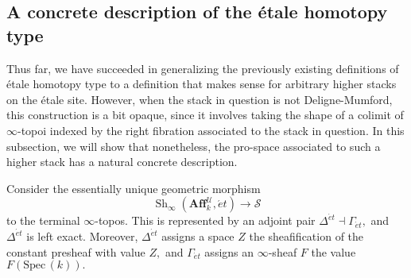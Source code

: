 \documentclass[12pt]{amsart}
\theoremstyle{definition}
\newcommand{\cS}{\mathcal{S}}
\newcommand{\cU}{\mathcal{U}}
\newcommand{\Affku}{\mathbf{Aff}^{\cU}_{k}}
\newcommand{\Spec}{\mathrm{Spec}\,}
\newcommand{\Sh}{\operatorname{Sh}}
\newcommand{\et}{\acute{e}t}
\renewcommand{\i}{\infty}
\def\Shi{\Sh_\i}
\begin{document}
\subsection{A concrete description of the \'etale homotopy type}

Thus far, we have succeeded in generalizing the previously existing definitions of \'etale homotopy type to a definition that makes sense for arbitrary higher stacks on the \'etale site. However, when the stack in question is not Deligne-Mumford, this construction is a bit opaque, since it involves taking the shape of a colimit of $\i$-topoi indexed by the right fibration associated to the stack in question. In this subsection, we will show that nonetheless, the pro-space associated to such a higher stack has a natural concrete description.

Consider the essentially unique geometric morphism $$\Shi\left(\Affku,\et\right) \to \cS$$ to the terminal $\i$-topos. This is represented by an adjoint pair $\Delta^{\et} \dashv \Gamma_{\et},$ and $\Delta^{\et}$ is left exact. Moreover, $\Delta^{\et}$ assigns a space $Z$ the sheafification of the constant presheaf with value $Z,$ and $\Gamma_{\et}$ assigns an $\i$-sheaf $F$ the value $F\left(\Spec\left(k\right)\right).$
\end{document}
